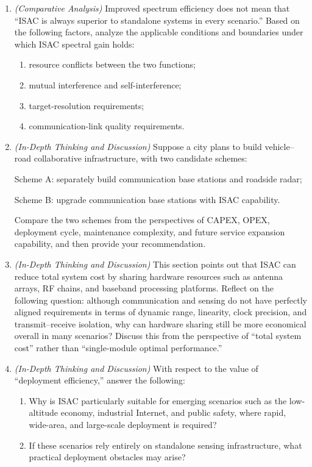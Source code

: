 \begin{enumerate}[label=\textbf{\arabic*.}, leftmargin=*]
    \item \textit{(Comparative Analysis)} Improved spectrum efficiency does not mean that ``ISAC is always superior to standalone systems in every scenario.'' Based on the following factors, analyze the applicable conditions and boundaries under which ISAC spectral gain holds:
    \begin{enumerate}[label=(\alph*)]
        \item resource conflicts between the two functions;
        \item mutual interference and self-interference;
        \item target-resolution requirements;
        \item communication-link quality requirements.
    \end{enumerate}

    \item \textit{(In-Depth Thinking and Discussion)} Suppose a city plans to build vehicle--road collaborative infrastructure, with two candidate schemes:

    Scheme A: separately build communication base stations and roadside radar;

    Scheme B: upgrade communication base stations with ISAC capability.

    Compare the two schemes from the perspectives of CAPEX, OPEX, deployment cycle, maintenance complexity, and future service expansion capability, and then provide your recommendation.

    \item \textit{(In-Depth Thinking and Discussion)} This section points out that ISAC can reduce total system cost by sharing hardware resources such as antenna arrays, RF chains, and baseband processing platforms. Reflect on the following question: although communication and sensing do not have perfectly aligned requirements in terms of dynamic range, linearity, clock precision, and transmit--receive isolation, why can hardware sharing still be more economical overall in many scenarios? Discuss this from the perspective of ``total system cost'' rather than ``single-module optimal performance.''

    \item \textit{(In-Depth Thinking and Discussion)} With respect to the value of ``deployment efficiency,'' answer the following:
    \begin{enumerate}[label=(\alph*)]
        \item Why is ISAC particularly suitable for emerging scenarios such as the low-altitude economy, industrial Internet, and public safety, where rapid, wide-area, and large-scale deployment is required?
        \item If these scenarios rely entirely on standalone sensing infrastructure, what practical deployment obstacles may arise?
    \end{enumerate}


\end{enumerate}
